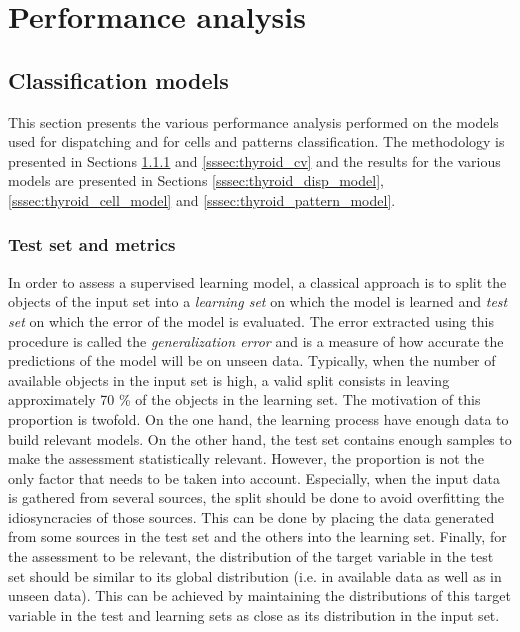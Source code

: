 \section{Performance analysis}
\label{sec:thyroid_perf}

\subsection{Classification models}
\label{ssec:thyroid_perf_models}

This section presents the various performance analysis performed on the models used for dispatching and for cells and patterns classification. The methodology is presented in Sections \ref{sssec:thyroid_test_set} and \ref{sssec:thyroid_cv} and the results for the various models are presented in Sections \ref{sssec:thyroid_disp_model}, \ref{sssec:thyroid_cell_model} and \ref{sssec:thyroid_pattern_model}.

\subsubsection{Test set and metrics}
\label{sssec:thyroid_test_set}
In order to assess a supervised learning model, a classical approach is to split the objects of the input set into a \textit{learning set} on which the model is learned and \textit{test set} on which the error of the model is evaluated. The error extracted using this procedure is called the \textit{generalization error} and is a measure of how accurate the predictions of the model will be on unseen data. Typically, when the number of available objects in the input set is high, a valid split consists in leaving approximately 70 \% of the objects in the learning set. The motivation of this proportion is twofold. On the one hand, the learning process have enough data to build relevant models. On the other hand, the test set contains enough samples to make the assessment statistically relevant. However, the proportion is not the only factor that needs to be taken into account. Especially, when the input data is gathered from several sources, the split should be done to avoid overfitting the idiosyncracies of those sources. This can be done by placing the data generated from some sources in the test set and the others into the learning set. Finally, for the assessment to be relevant, the distribution of the target variable in the test set should be similar to its global distribution (i.e. in available data as well as in unseen data). This can be achieved by maintaining the distributions of this target variable in the test and learning sets as close as its distribution in the input set. 

